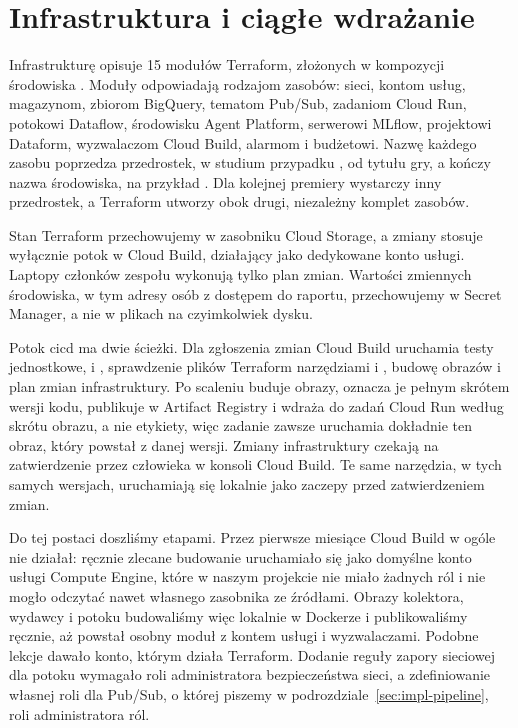\section{Infrastruktura i ciągłe wdrażanie}
\label{sec:impl-infrastructure}

Infrastrukturę opisuje 15 modułów Terraform, złożonych w kompozycji środowiska .
Moduły odpowiadają rodzajom zasobów: sieci, kontom usług, magazynom, zbiorom BigQuery, tematom Pub/Sub, zadaniom Cloud Run, potokowi Dataflow, środowisku Agent Platform, serwerowi MLflow, projektowi Dataform, wyzwalaczom Cloud Build, alarmom i budżetowi.
Nazwę każdego zasobu poprzedza przedrostek, w studium przypadku , od tytułu gry, a kończy nazwa środowiska, na przykład .
Dla kolejnej premiery wystarczy inny przedrostek, a Terraform utworzy obok drugi, niezależny komplet zasobów.

Stan Terraform przechowujemy w zasobniku Cloud Storage, a zmiany stosuje wyłącznie potok w Cloud Build, działający jako dedykowane konto usługi.
Laptopy członków zespołu wykonują tylko plan zmian.
Wartości zmiennych środowiska, w tym adresy osób z dostępem do raportu, przechowujemy w Secret Manager, a nie w plikach na czyimkolwiek dysku.

Potok \ac{cicd} ma dwie ścieżki.
Dla zgłoszenia zmian Cloud Build uruchamia testy jednostkowe,  i , sprawdzenie plików Terraform narzędziami  i , budowę obrazów i plan zmian infrastruktury.
Po scaleniu buduje obrazy, oznacza je pełnym skrótem wersji kodu, publikuje w Artifact Registry i wdraża do zadań Cloud Run według skrótu obrazu, a nie etykiety, więc zadanie zawsze uruchamia dokładnie ten obraz, który powstał z danej wersji.
Zmiany infrastruktury czekają na zatwierdzenie przez człowieka w konsoli Cloud Build.
Te same narzędzia, w tych samych wersjach, uruchamiają się lokalnie jako zaczepy przed zatwierdzeniem zmian.

Do tej postaci doszliśmy etapami.
Przez pierwsze miesiące Cloud Build w ogóle nie działał: ręcznie zlecane budowanie uruchamiało się jako domyślne konto usługi Compute Engine, które w naszym projekcie nie miało żadnych ról i nie mogło odczytać nawet własnego zasobnika ze źródłami.
Obrazy kolektora, wydawcy i potoku budowaliśmy więc lokalnie w Dockerze i publikowaliśmy ręcznie, aż powstał osobny moduł z kontem usługi i wyzwalaczami.
Podobne lekcje dawało konto, którym działa Terraform.
Dodanie reguły zapory sieciowej dla potoku wymagało roli administratora bezpieczeństwa sieci, a zdefiniowanie własnej roli dla Pub/Sub, o której piszemy w podrozdziale~\ref{sec:impl-pipeline}, roli administratora ról.

